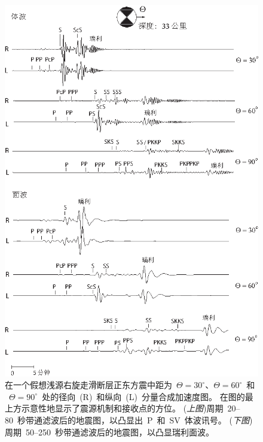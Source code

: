 \begin{figure}
\begin{center}
\includegraphics{../figures/chap10/fig11.eps}
\end{center}
\caption[seismogram2]{
\label{fig:10.13}
在一个假想浅源右旋走滑断层正东方震中距为~$\Theta=30^\circ$、$\Theta=60^\circ$~和 ~$\Theta=90^\circ$~处的径向~(R)~和纵向~(L)~分量合成加速度图。
在图的最上方示意性地显示了震源机制和接收点的方位。
({\em 上图\/})周期~20--80~秒带通滤波后的地震图，以凸显出~P~和~SV~体波讯号。 
({\em 下图\/})周期~50--250~秒带通滤波后的地震图，以凸显瑞利面波。
}
\end{figure}
